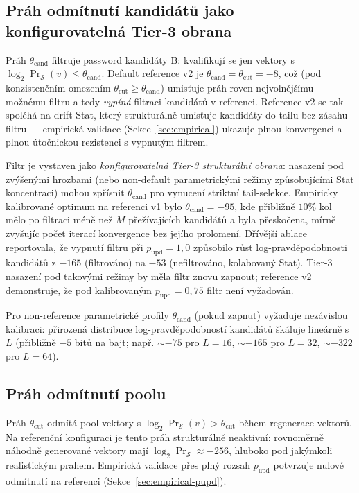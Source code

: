 \documentclass[11pt,a4paper]{article}
\begin{document}
\subsection{Práh odmítnutí kandidátů jako konfigurovatelná Tier-3 obrana}\label{sec:cand-threshold}

Práh $\theta_\text{cand}$ filtruje password kandidáty B: kvalifikují se jen vektory s $\log_2 \Pr_\mathcal{S}(v) \leq \theta_\text{cand}$. Default reference v2 je $\theta_\text{cand} = \theta_\text{cut} = -8$, což (pod konzistenčním omezením $\theta_\text{cut} \geq \theta_\text{cand}$) umisťuje práh roven nejvolnějšímu možnému filtru a tedy \emph{vypíná} filtraci kandidátů v referenci. Reference v2 se tak spoléhá na drift Stat, který strukturálně umisťuje kandidáty do tailu bez zásahu filtru --- empirická validace (Sekce~\ref{sec:empirical}) ukazuje plnou konvergenci a plnou útočnickou rezistenci s vypnutým filtrem.

Filtr je vystaven jako \emph{konfigurovatelná Tier-3 strukturální obrana}: nasazení pod zvýšenými hrozbami (nebo non-default parametrickými režimy způsobujícími Stat koncentraci) mohou zpřísnit $\theta_\text{cand}$ pro vynucení striktní tail-selekce. Empiricky kalibrované optimum na referenci v1 bylo $\theta_\text{cand} = -95$, kde přibližně $10\%$ kol mělo po filtraci méně než $M$ přežívajících kandidátů a byla přeskočena, mírně zvyšujíc počet iterací konvergence bez jejího prolomení. Dřívější ablace~\cite{F4Calibration} reportovala, že vypnutí filtru při $p_\text{upd} = 1{,}0$ způsobilo růst log-pravděpodobnosti kandidátů z $-165$ (filtrováno) na $-53$ (nefiltrováno, kolabovaný Stat). Tier-3 nasazení pod takovými režimy by měla filtr znovu zapnout; reference v2 demonstruje, že pod kalibrovaným $p_\text{upd} = 0{,}75$ filtr není vyžadován.

Pro non-reference parametrické profily $\theta_\text{cand}$ (pokud zapnut) vyžaduje nezávislou kalibraci: přirozená distribuce log-pravděpodobností kandidátů škáluje lineárně s $L$ (přibližně $-5$ bitů na bajt; např. $\sim -75$ pro $L = 16$, $\sim -165$ pro $L = 32$, $\sim -322$ pro $L = 64$).

\subsection{Práh odmítnutí poolu}

Práh $\theta_\text{cut}$ odmítá pool vektory s $\log_2 \Pr_\mathcal{S}(v) > \theta_\text{cut}$ během regenerace vektorů. Na referenční konfiguraci je tento práh strukturálně neaktivní: rovnoměrně náhodně generované vektory mají $\log_2 \Pr_\mathcal{S} \approx -256$, hluboko pod jakýmkoli realistickým prahem. Empirická validace přes plný rozsah $p_\text{upd}$ potvrzuje nulové odmítnutí na referenci (Sekce~\ref{sec:empirical-pupd}).
\end{document}
